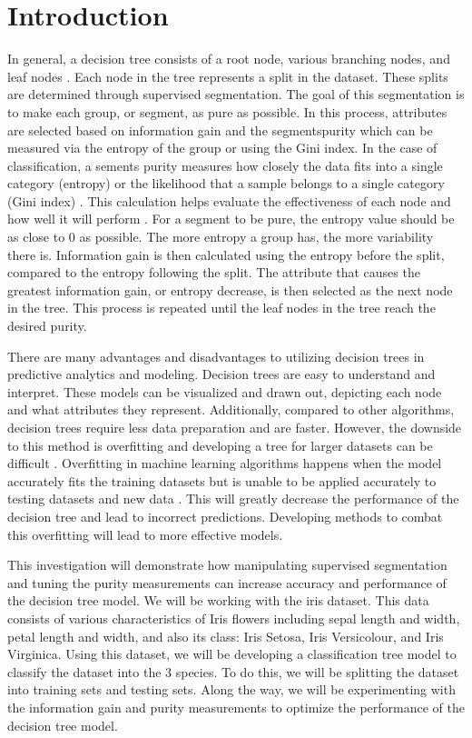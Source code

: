 \documentclass[journal]{IEEEtran}
\begin{document}
\section{Introduction}
In general, a decision tree consists of a root node, various branching nodes, and leaf nodes \cite{b1}. Each node in the tree represents a split in the dataset. These splits are determined through supervised segmentation. The goal of this segmentation is to make each group, or segment, as pure as possible. In this process, attributes are selected based on information gain and the segments\textquotesingle purity which can be measured via the entropy of the group or using the Gini index. In the case of classification, a sement\textquotesingle s purity measures how closely the data fits into a single category (entropy) or the likelihood that a sample belongs to a single category (Gini index) \cite{b2}. This calculation helps evaluate the effectiveness of each node and how well it will perform \cite{b1}. For a segment to be pure, the entropy value should be as close to 0 as possible. The more entropy a group has, the more variability there is. Information gain is then calculated using the entropy before the split, compared to the entropy following the split. The attribute that causes the greatest information gain, or entropy decrease, is then selected as the next node in the tree. This process is repeated until the leaf nodes in the tree reach the desired purity. 

There are many advantages and disadvantages to utilizing decision trees in predictive analytics and modeling. Decision trees are easy to understand and interpret. These models can be visualized and drawn out, depicting each node and what attributes they represent. Additionally, compared to other algorithms, decision trees require less data preparation and are faster. However, the downside to this method is overfitting and developing a tree for larger datasets can be difficult \cite{b3}. Overfitting in machine learning algorithms happens when the model accurately fits the training datasets but is unable to be applied accurately to testing datasets and new data \cite{b4}. This will greatly decrease the performance of the decision tree and lead to incorrect predictions. Developing methods to combat this overfitting will lead to more effective models. 

This investigation will demonstrate how manipulating supervised segmentation and tuning the purity measurements can increase accuracy and performance of the decision tree model. We will be working with the iris dataset. This data consists of various characteristics of Iris flowers including sepal length and width, petal length and width, and also its class: Iris Setosa, Iris Versicolour, and Iris Virginica. Using this dataset, we will be developing a classification tree model to classify the dataset into the 3 species. To do this, we will be splitting the dataset into training sets and testing sets. Along the way, we will be experimenting with the information gain and purity measurements to optimize the performance of the decision tree model. 
\end{document}
